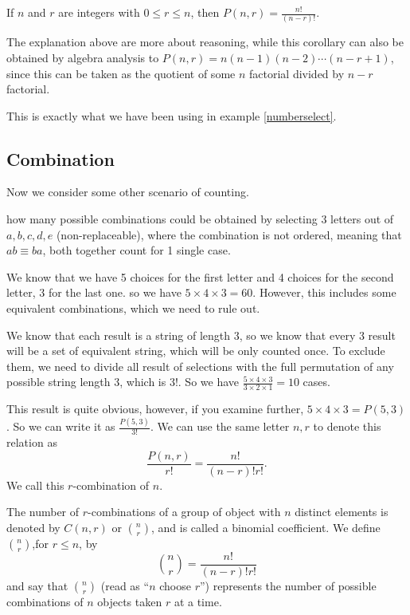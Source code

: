         \begin{corollary}
            If $n$ and $r$ are integers with $0\leq r\leq n$, then $P(n,r)=\frac{n!}{(n-r)!}.$
        \end{corollary}
        The explanation above are more about reasoning, while this corollary can also be obtained by 
        algebra analysis to $P(n,r)=n(n-1)(n-2)\cdots(n-r+1)$, since this can be taken as the quotient 
        of some $n$ factorial divided by $n-r$ factorial.
        
        This is exactly what we have been using in example \ref{numberselect}.
        \subsection{Combination}
        Now we consider some other scenario of counting.
        \begin{example}
        how many possible combinations
        could be obtained by selecting 3 letters out of $a,b,c,d,e$ (non-replaceable), where the combination is not ordered,
        meaning that $ab\equiv ba$, both together count for 1 single case.
        \end{example}
        \begin{solution}
            We know that we have 5 choices for the first letter and 4 choices for the second letter, 3 for the last one.
            so we have $5\times 4\times 3 = 60$. However, this includes some equivalent combinations,
            which we need to rule out. 

            We know that each result is a string of length 3, so we know that every 3 result will be 
            a set of equivalent string, which will be only counted once. To exclude them, we need to 
            divide all result of selections with the full permutation of any possible string length 3,
            which is $3!$. So we have $\frac{5\times 4 \times 3}{3\times 2 \times 1} = 10$ cases. 
        \end{solution}
        This result is quite obvious, however, if you examine further, $5\times 4 \times 3 = P(5,3)$.
        So we can write it as $\frac{P(5,3)}{3!}$. We can use the same letter $n,r$ to denote this relation
        as $$\frac{P(n,r)}{r!} = \frac{n!}{(n-r)!r!}.$$
        We call this $r$-combination of $n$.
        \begin{theorem}[$r$-combination]\label{rcombi}
            The number of $r$-combinations of a group of object with $n$ distinct elements is denoted
            by $C(n,r)$ or $\binom{n}{r}$, and is called a binomial coefficient.
            We define $\binom{n}{r}$,for $r\leq n$, by
            $$\binom{n}{r} = \frac{n!}{(n-r)!r!}$$
            and say that $\binom{n}{r}$ (read as “$n$ choose $r$”) represents the number of possible combinations of $n$ objects taken $r$ at a time.
        \end{theorem}
